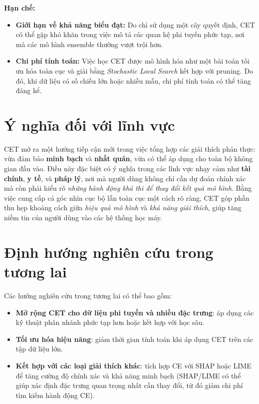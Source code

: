 \textbf{Hạn chế:}
\begin{itemize}
    \item \textbf{Giới hạn về khả năng biểu đạt:} Do chỉ sử dụng một cây quyết định, CET có thể gặp khó khăn trong việc mô tả các quan hệ phi tuyến phức tạp, nơi mà các mô hình ensemble thường vượt trội hơn.
    \item \textbf{Chi phí tính toán:} Việc học CET được mô hình hóa như một bài toán tối ưu hóa toàn cục và giải bằng \textit{Stochastic Local Search} kết hợp với pruning. Do đó, khi dữ liệu có số chiều lớn hoặc nhiều mẫu, chi phí tính toán có thể tăng đáng kể.
\end{itemize}


\section{Ý nghĩa đối với lĩnh vực}
CET mở ra một hướng tiếp cận mới trong việc tổng hợp các giải thích phản thực: vừa đảm bảo \textbf{minh bạch} và \textbf{nhất quán}, vừa có thể áp dụng cho toàn bộ không gian đầu vào. Điều này đặc biệt có ý nghĩa trong các lĩnh vực nhạy cảm như \textbf{tài chính}, \textbf{y tế}, và \textbf{pháp lý}, nơi mà người dùng không chỉ cần dự đoán chính xác mà còn phải hiểu rõ \textit{những hành động khả thi để thay đổi kết quả mô hình}. Bằng việc cung cấp cả góc nhìn cục bộ lẫn toàn cục một cách rõ ràng, CET góp phần thu hẹp khoảng cách giữa \textit{hiệu quả mô hình} và \textit{khả năng giải thích}, giúp tăng niềm tin của người dùng vào các hệ thống học máy.


\section{Định hướng nghiên cứu trong tương lai}
Các hướng nghiên cứu trong tương lai có thể bao gồm:
\begin{itemize}
    \item \textbf{Mở rộng CET cho dữ liệu phi tuyến và nhiều đặc trưng}: áp dụng các kỹ thuật phân nhánh phức tạp hơn hoặc kết hợp với học sâu.
    \item \textbf{Tối ưu hóa hiệu năng}: giảm thời gian tính toán khi áp dụng CET trên các tập dữ liệu lớn.
    \item \textbf{Kết hợp với các loại giải thích khác}: tích hợp CE với SHAP hoặc LIME để tăng cường độ chính xác và khả năng minh bạch (SHAP/LIME có thể giúp xác định đặc trưng quan trọng nhất cần thay đổi, từ đó giảm chi phí tìm kiếm hành động CE).
\end{itemize}
